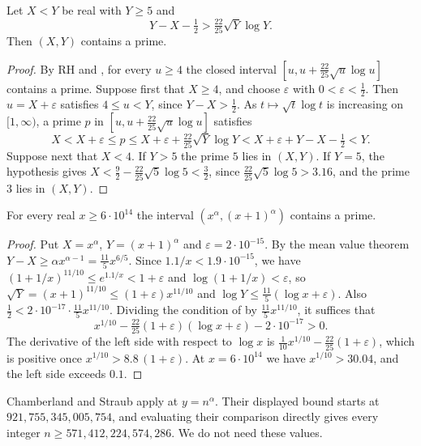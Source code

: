 \documentclass[11pt,colorlinks]{charlie}
\begin{document}
\begin{lemma}\label{lem:cms}
Let $X<Y$ be real with $Y\ge5$ and
\[
 Y-X-\tfrac12>\tfrac{22}{25}\sqrt Y\log Y .
\]
Then $(X,Y)$ contains a prime.
\end{lemma}
\begin{proof}
By RH \cite{Alpoge} and \cite[Theorem~5]{CMS}, for every $u\ge4$ the closed interval $[u,u+\frac{22}{25}\sqrt u\log u]$ contains a prime. Suppose first that $X\ge4$, and choose $\varepsilon$ with $0<\varepsilon<\frac12$. Then $u=X+\varepsilon$ satisfies $4\le u<Y$, since $Y-X>\frac12$. As $t\mapsto\sqrt t\log t$ is increasing on $[1,\infty)$, a prime $p$ in $[u,u+\frac{22}{25}\sqrt u\log u]$ satisfies
\[
 X<X+\varepsilon\le p\le X+\varepsilon+\tfrac{22}{25}\sqrt Y\log Y<X+\varepsilon+Y-X-\tfrac12<Y .
\]
Suppose next that $X<4$. If $Y>5$ the prime $5$ lies in $(X,Y)$. If $Y=5$, the hypothesis gives $X<\frac92-\frac{22}{25}\sqrt5\log5<\frac32$, since $\frac{22}{25}\sqrt5\log5>3.16$, and the prime $3$ lies in $(X,Y)$.
\end{proof}

\begin{corollary}\label{cor:cms}
For every real $x\ge6\cdot10^{14}$ the interval $(x^\alpha,(x+1)^\alpha)$ contains a prime.
\end{corollary}
\begin{proof}
Put $X=x^\alpha$, $Y=(x+1)^\alpha$ and $\varepsilon=2\cdot10^{-15}$. By the mean value theorem $Y-X\ge\alpha x^{\alpha-1}=\frac{11}5x^{6/5}$. Since $1.1/x<1.9\cdot10^{-15}$, we have $(1+1/x)^{11/10}\le e^{1.1/x}<1+\varepsilon$ and $\log(1+1/x)<\varepsilon$, so $\sqrt Y=(x+1)^{11/10}\le(1+\varepsilon)x^{11/10}$ and $\log Y\le\frac{11}5(\log x+\varepsilon)$. Also $\frac12<2\cdot10^{-17}\cdot\frac{11}5x^{11/10}$. Dividing the condition of  by $\frac{11}5x^{11/10}$, it suffices that
\[
 x^{1/10}-\tfrac{22}{25}(1+\varepsilon)(\log x+\varepsilon)-2\cdot10^{-17}>0 .
\]
The derivative of the left side with respect to $\log x$ is $\frac1{10}x^{1/10}-\frac{22}{25}(1+\varepsilon)$, which is positive once $x^{1/10}>8.8\,(1+\varepsilon)$. At $x=6\cdot10^{14}$ we have $x^{1/10}>30.04$, and the left side exceeds $0.1$.
\end{proof}

\begin{remark}
Chamberland and Straub \cite[\S3]{CS} apply \cite{CMS} at $y=n^\alpha$. Their displayed bound starts at $921{,}755{,}345{,}005{,}754$, and evaluating their comparison \cite[(6)]{CS} directly gives every integer $n\ge571{,}412{,}224{,}574{,}286$. We do not need these values.
\end{remark}
\end{document}
